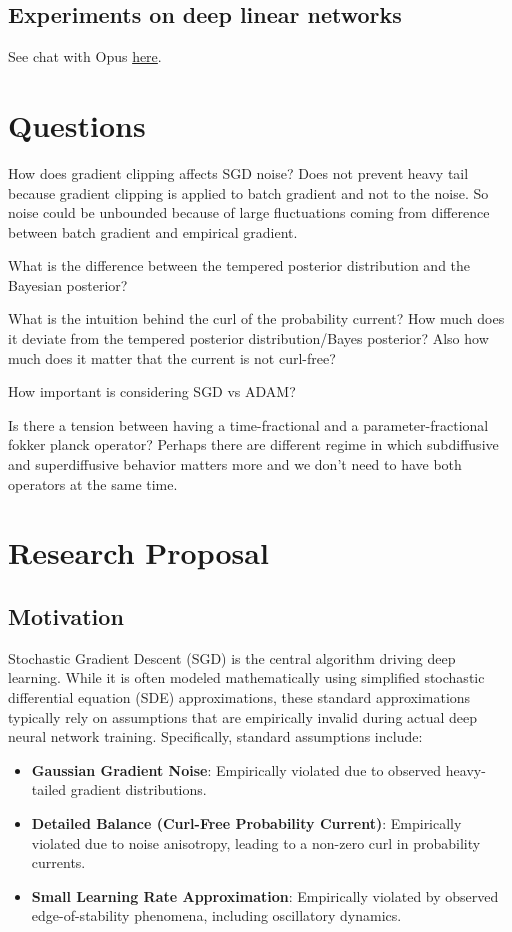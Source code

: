 \documentclass[11pt]{article}
\begin{document}
\subsection{Experiments on deep linear networks}
See chat with Opus \href{https://claude.ai/chat/ac289a72-d57a-4d4b-ad09-38f17425753c}{here}.
\section{Questions}
How does gradient clipping affects SGD noise? Does not prevent heavy tail because gradient clipping is applied to batch gradient and not to the noise. So noise could be unbounded because of large fluctuations coming from difference between batch gradient and empirical gradient.

What is the difference between the tempered posterior distribution and the Bayesian posterior?

What is the intuition behind the curl of the probability current? How much does it deviate from the tempered posterior distribution/Bayes posterior? Also how much does it matter that the current is not curl-free?

How important is considering SGD vs ADAM?

Is there a tension between having a time-fractional and a parameter-fractional fokker planck operator? Perhaps there are different regime in which subdiffusive and superdiffusive behavior matters more and we don't need to have both operators at the same time.
\section{Research Proposal}

\subsection{Motivation}

Stochastic Gradient Descent (SGD) is the central algorithm driving deep learning. While it is often modeled mathematically using simplified stochastic differential equation (SDE) approximations, these standard approximations typically rely on assumptions that are empirically invalid during actual deep neural network training. Specifically, standard assumptions include:

\begin{itemize}
\item \textbf{Gaussian Gradient Noise}: Empirically violated due to observed heavy-tailed gradient distributions.
\item \textbf{Detailed Balance (Curl-Free Probability Current)}: Empirically violated due to noise anisotropy, leading to a non-zero curl in probability currents.
\item \textbf{Small Learning Rate Approximation}: Empirically violated by observed edge-of-stability phenomena, including oscillatory dynamics.
\end{itemize}
\end{document}
